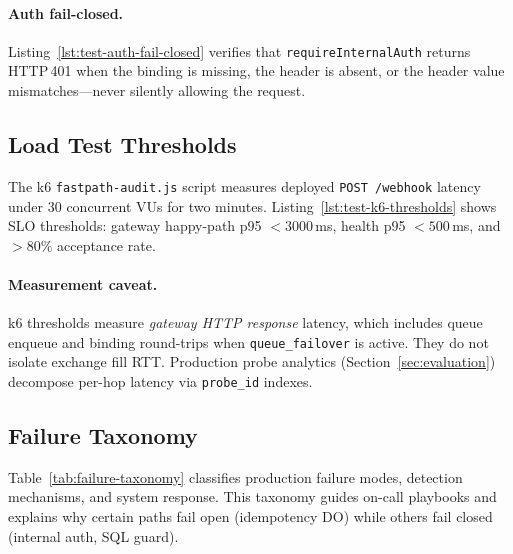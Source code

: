 
\paragraph{Auth fail-closed.} Listing~\ref{lst:test-auth-fail-closed} verifies that \texttt{requireInternalAuth} returns HTTP\,401 when the binding is missing, the header is absent, or the header value mismatches---never silently allowing the request.


\subsection{Load Test Thresholds}

The k6 \texttt{fastpath-audit.js} script measures deployed \texttt{POST /webhook} latency under 30 concurrent VUs for two minutes. Listing~\ref{lst:test-k6-thresholds} shows SLO thresholds: gateway happy-path p95 ${<}3000$\,ms, health p95 ${<}500$\,ms, and ${>}80\%$ acceptance rate.

\paragraph{Measurement caveat.} k6 thresholds measure \emph{gateway HTTP response} latency, which includes queue enqueue and binding round-trips when \texttt{queue\_failover} is active. They do not isolate exchange fill RTT. Production probe analytics (Section~\ref{sec:evaluation}) decompose per-hop latency via \texttt{probe\_id} indexes.


\subsection{Failure Taxonomy}

Table~\ref{tab:failure-taxonomy} classifies production failure modes, detection mechanisms, and system response. This taxonomy guides on-call playbooks and explains why certain paths fail open (idempotency DO) while others fail closed (internal auth, SQL guard).

